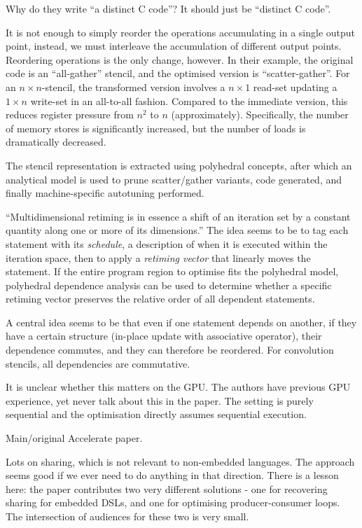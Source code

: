 \documentclass[a4paper, oneside, final]{memoir}
\begin{document}
Why do they write ``a distinct C code''?  It should just be ``distinct
C code''.

It is not enough to simply reorder the operations accumulating in a
single output point, instead, we must interleave the accumulation of
different output points.  Reordering operations is the only change,
however.  In their example, the original code is an ``all-gather''
stencil, and the optimised version is ``scatter-gather''.  For an $n
\times n$-stencil, the transformed version involves a $n \times 1$
read-set updating a $1 \times n$ write-set in an all-to-all fashion.
Compared to the immediate version, this reduces register pressure from
$n^{2}$ to $n$ (approximately).  Specifically, the number of memory
stores is significantly increased, but the number of loads is
dramatically decreased.

The stencil representation is extracted using polyhedral concepts,
after which an analytical model is used to prune scatter/gather
variants, code generated, and finally machine-specific autotuning
performed.

``Multidimensional retiming is in essence a shift of an iteration set
by a constant quantity along one or more of its dimensions.''  The
idea seems to be to tag each statement with its \textit{schedule}, a
description of when it is executed within the iteration space, then to
apply a \textit{retiming vector} that linearly moves the statement.
If the entire program region to optimise fits the polyhedral model,
polyhedral dependence analysis can be used to determine whether a
specific retiming vector preserves the relative order of all dependent
statements.

A central idea seems to be that even if one statement depends on
another, if they have a certain structure (in-place update with
associative operator), their dependence commutes, and they can
therefore be reordered.  For convolution stencils, all dependencies
are commutative.

It is unclear whether this matters on the GPU.  The authors have
previous GPU experience, yet never talk about this in the paper.  The
setting is purely sequential and the optimisation directly assumes
sequential execution.

\begin{quote}
\end{quote}

Main/original Accelerate paper.

Lots on sharing, which is not relevant to non-embedded languages.  The
approach seems good if we ever need to do anything in that direction.
There is a lesson here: the paper contributes two very different
solutions - one for recovering sharing for embedded DSLs, and one for
optimising producer-consumer loops.  The intersection of audiences for
these two is very small.
\end{document}
